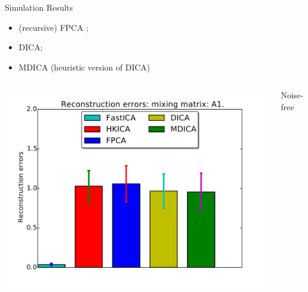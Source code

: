 \documentclass[final]{beamer} %
\newcommand{\bc}{\begin{center}}
\newcommand{\ec}{\end{center}}
\begin{document}
\begin{frame}[c]
\begin{columns}[t,totalwidth=\textwidth]
\begin{column}{0.32\textwidth}
\begin{block}{Simulation Results}
\begin{itemize}
				\item (recursive) FPCA \citep{vempala2014max};
				\item DICA; 
				\item MDICA (heuristic version of DICA)
			\end{itemize}
			\begin{columns}[t]
			\includegraphics[width=\textwidth]{barchart-A1-noisefree}
			\bc
			Noise-free
			\ec
			

\end{columns}
\end{block}
\end{column}
\end{columns}
\end{frame}
\end{document}
